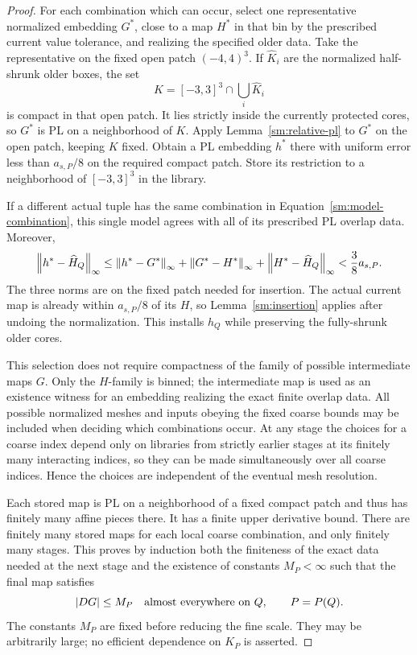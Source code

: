\begin{proof}
For each combination which can occur, select one
representative normalized embedding $G^*$, close
to a map $H^*$ in that bin by the prescribed
current value tolerance, and realizing the
specified older data.  Take the representative
on the fixed open patch $(-4,4)^3$.  If
$\widehat K_i$ are the normalized half-shrunk
older boxes, the set
\[
 K=[-3,3]^3\cap\bigcup_i\widehat K_i
\]
is compact in that open patch.  It lies
strictly inside the currently protected
cores, so $G^*$ is PL on a neighborhood of
$K$.  Apply Lemma~\ref{sm:relative-pl} to
$G^*$ on the open patch, keeping $K$ fixed.
Obtain a PL embedding $h^*$ there with
uniform error less than $a_{s,P}/8$ on the
required compact patch.  Store its restriction
to a neighborhood of $[-3,3]^3$ in the library.

If a different actual tuple has the same
combination in Equation~\eqref{sm:model-combination}, this
single model agrees with all of its prescribed
PL overlap data.  Moreover,
\begin{equation}
 \label{sm:reuse-error}
 \left\lVert h^*-\widehat H_Q\right\rVert_{\infty}
 \le \left\lVert h^*-G^*\right\rVert_{\infty}
     +\left\lVert G^*-H^*\right\rVert_{\infty}
     +\left\lVert H^*-\widehat H_Q\right\rVert_{\infty}
 <\frac38 a_{s,P}.
\end{equation}
The three norms are on the fixed patch needed
for insertion.  The actual current map is
already within $a_{s,P}/8$ of its $H$, so
Lemma~\ref{sm:insertion} applies after undoing
the normalization.  This installs $h_Q$ while
preserving the fully-shrunk older cores.

This selection does not require compactness of
the family of possible intermediate maps $G$.
Only the $H$-family is binned; the intermediate
map is used as an existence witness for an
embedding realizing the exact finite overlap
data.  All possible normalized meshes and
inputs obeying the fixed coarse bounds may
be included when deciding which combinations
occur.  At any stage the choices for a coarse
index depend only on libraries from strictly
earlier stages at its finitely many interacting
indices, so they can be made simultaneously
over all coarse indices.  Hence the choices are independent of
the eventual mesh resolution.

Each stored map is PL on a neighborhood of a
fixed compact patch and thus has finitely many
affine pieces there.  It has a finite upper
derivative bound.  There are finitely many
stored maps for each local coarse combination,
and only finitely many stages.  This proves by
induction both the finiteness of the exact data
needed at the next stage and the existence of
constants $M_P<\infty$ such that the final map
satisfies
\begin{equation}
 \label{sm:model-derivative-bound}
 |DG|\le M_P\quad\hbox{almost everywhere on }Q,
 \qquad P=P(Q).
\end{equation}
The constants $M_P$ are fixed before reducing
the fine scale.  They may be arbitrarily large;
no efficient dependence on $K_P$ is asserted.


\end{proof}
